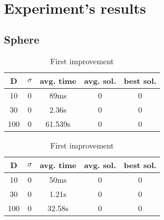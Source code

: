 \documentclass{article}
\begin{document}
\section{Experiment's results}

\subsection{Sphere}
 
\begin{table}[htbp]
\begin{minipage}{.4\linewidth}
    \centering

    \begin{tabular}{|c|c|c|c|c|}
    \hline
    D   & $\sigma$  & avg. time     & avg. sol.     & best sol. \\
    \hline
    10  & 0         & 89ms          & 0       & 0 \\
    \hline
    30  & 0         & 2.36s         & 0       & 0 \\
    \hline
    100 & 0         & 61.539s       & 0       & 0 \\
    \hline
    \end{tabular}
    \caption{Best improvement}
  \end{minipage}%
  \quad %
  \begin{minipage}{.75\linewidth}
    \centering

    \begin{tabular}{|c|c|c|c|c|}
    \hline
    D   & $\sigma$  & avg. time     & avg. sol.     & best sol. \\
    \hline
    10  & 0         & 50ms          & 0             & 0 \\
    \hline
    30  & 0         & 1.21s         & 0             & 0 \\
    \hline
    100 & 0         & 32.58s        & 0             & 0 \\
    \hline
    \end{tabular}
    \caption{First improvement}
  \end{minipage}
\end{table}
\end{document}
